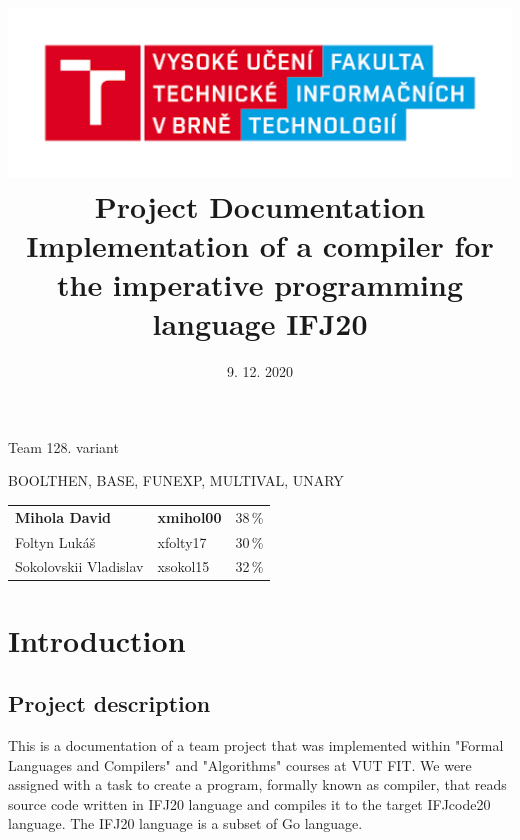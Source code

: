 \documentclass[12pt]{article}
\title{
\includegraphics[scale=0.5]{img/logo.png}\\
\Huge{Project Documentation}\\
\large{Implementation of a compiler for the imperative programming language IFJ20}
}
\author{}%
\date{9. 12. 2020}
\begin{document}
\pagecolor{white}
	\maketitle
	\thispagestyle{empty}
	\begin{center}\large Team 128. variant \uppercase\expandafter{\relax}\\
		\begin{large}{\scriptsize BOOLTHEN, BASE, FUNEXP, MULTIVAL, UNARY \\ \par}\end{large}
	\end{center}
	\vfill
	\begin{center}
		
		\begin{large}
			\begin{tabular}{l l l}
				\textbf{Mihola David} & \textbf{xmihol00} &  38\,\% \\
				Foltyn Lukáš & xfolty17 &  30\,\% \\
				Sokolovskii Vladislav & xsokol15 & 32\,\% \\
			\end{tabular}
		\end{large}
	\end{center}
	
\newpage
\setcounter{page}{1}
\tableofcontents
\newpage
\setcounter{page}{3}
\section{Introduction}
\subsection{Project description}
	This is a documentation of a team project that was implemented within "Formal Languages and Compilers" and "Algorithms" courses at VUT FIT. We were assigned with a task to create a program, formally known as compiler, that reads source code written in IFJ20 language and compiles it to the target IFJcode20 language. The IFJ20 language is a subset of Go language.
	
\end{document}
